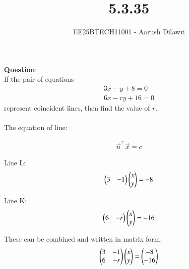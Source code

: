 \documentclass[journal]{IEEEtran}
\begin{document}

\vspace{3cm}

\title{5.3.35}
\author{EE25BTECH11001 - Aarush Dilawri}
\maketitle
{\let\newpage\relax\maketitle}

\renewcommand{\thefigure}{\theenumi}
\renewcommand{\thetable}{\theenumi}
\setlength{\intextsep}{10pt} %

\renewcommand{\thetable}{\theenumi}

\textbf{Question}:\\
If the pair of equations\\
\begin{align}
    3x-y+8=0\\
    6x-ry+16=0
\end{align}
represent coincident lines, then find the value of $r$.\\
\solution\\
The equation of line:

\begin{align}
\vec{n}^\top\vec{x}=c
\end{align}

Line L:
\begin{align}
\begin{pmatrix}3 & -1\end{pmatrix}\begin{pmatrix}x \\ y\end{pmatrix}=-8
\end{align}

Line K:
\begin{align}
\begin{pmatrix}6 & -r\end{pmatrix}\begin{pmatrix}x \\ y\end{pmatrix}=-16
\end{align}

These can be combined and written in matrix form:
\begin{align}
\begin{pmatrix}3 & -1 \\ 6 & -r\end{pmatrix}\begin{pmatrix}x \\ y\end{pmatrix} = \begin{pmatrix}-8 \\ -16\end{pmatrix}
\end{align}
\end{document}
